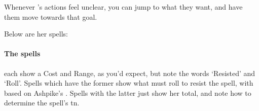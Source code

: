 Whenever 's actions feel unclear, you can jump to what they want, and have them move towards that goal.

Below are her spells:

\bigLine

\showStdSpells

\bigLine

\paragraph{The spells}
each show a Cost and Range, as you'd expect, but note the words `Resisted' and `Roll'.
Spells which have the former show what  must roll to resist the spell, with  based on Ashpike's .
Spells with the latter just show her  total, and note how to determine the spell's \gls{tn}.

